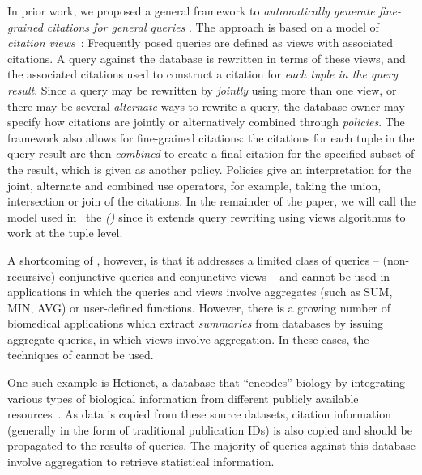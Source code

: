 In prior work, we proposed a general framework to {\em automatically generate fine-grained citations for general queries} \cite{alawini2017automating,wu2018data}.
The approach is based on a model of {\em citation views}~\cite{BunemanEtAl2016,davidson2017model,DBLP:conf/pods/DavidsonBDMS17}: Frequently posed queries  are defined as views with associated citations. A query against the database is rewritten in terms of these views, and the associated citations used to construct a citation for \textit{each tuple in the query result}. Since a query may be rewritten by \textit{jointly} using more than one view, or there may be several \textit{alternate} ways to rewrite a query, the database owner may specify how citations are jointly or alternatively combined through \textit{policies}.  The framework also allows for fine-grained citations: the citations for each tuple in the query result are then \textit{combined} to create a final citation for the specified subset of the result, which is given as another policy.  Policies give an interpretation for the joint, alternate and combined use operators, for example, taking the union, intersection or join of the citations.  In the remainder of the paper, we will call the model used in~\cite{wu2018data} the {\em {\rbafull} (\rba)} since it  extends query rewriting using views algorithms to work at the tuple level.

A shortcoming of {\rba}, however, is that it addresses a limited class of queries -- (non-recursive) conjunctive queries and conjunctive views -- and cannot be used in applications in which the queries and views involve aggregates (such as SUM, MIN, AVG) or user-defined functions.  However, there is a growing number of biomedical applications which extract \textit{summaries} from data\-bases by issuing aggregate queries, in which views involve aggregation. In these cases, the techniques of \cite{wu2018data} cannot be used.


One such example is Hetionet, a database that ``encodes'' biology by integrating various types of biological information from different publicly available resources~\cite{himmelstein2017systematic}.
As data is copied from these source datasets, citation information (generally in the form of traditional publication IDs) is also copied and should be propagated to the results of queries.
The majority of queries against this database involve aggregation to retrieve statistical information.

